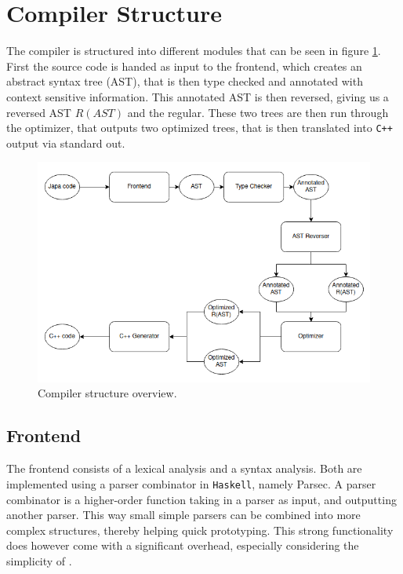 \section{Compiler Structure \ms}
The \lan compiler is structured into different modules that can be seen in figure
\ref{fig:compiler-overview}. First the \lan source code is handed as input to the frontend,
which creates an abstract syntax tree (AST), that is then type checked and annotated with
context sensitive information. This annotated AST is then reversed, giving us a reversed AST
$R(AST)$ and the regular. These two trees are then run through the optimizer, that outputs
two optimized trees, that is then translated into \texttt{C++} output via standard out.

\begin{figure}[h!]
    \centering
    \includegraphics[scale=0.6]{imgs/compiler-overview.png}
    \caption{Compiler structure overview.}
    \label{fig:compiler-overview}
\end{figure}

\subsection{Frontend \rr}
The frontend consists of a lexical analysis and a syntax analysis. Both are implemented using a
parser combinator in \texttt{Haskell}, namely Parsec. A parser combinator is a higher-order
function taking in a parser as input, and outputting another parser. This way small simple parsers
can be combined into more complex structures, thereby helping quick prototyping. This strong
functionality does however come with a significant overhead, especially considering the simplicity
of \lan \cite{parser}.

